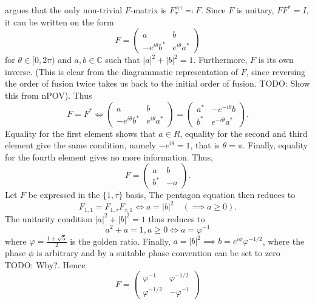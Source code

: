 \documentclass[a4paper,10pt,oneside]{book}
\theoremstyle{plain}
\theoremstyle{definition}
\theoremstyle{remark}
\begin{document}
{\cite[p. 389-390]{short intro fib} argues that the only non-trivial $F$-matrix is $F^{\tau\tau\tau}_\tau \eqqcolon F$.
Since $F$ is unitary, $FF^* = I$, it can be written on the form
\begin{equation*}
  F = \begin{pmatrix} a & b \\ -e^{i\theta}b^* & e^{i\theta}a^* \end{pmatrix}
\end{equation*}
for $\theta \in [0, 2\pi)$ and $a, b \in \mathbb{C}$ such that $|a|^2 + |b|^2 = 1$.
Furthermore, $F$ is its own inverse. (This is clear from the diagrammatic representation of $F$, since reversing the order of fusion twice takes us back to the initial order of fusion. TODO: Show this from nPOV). Thus
\begin{equation*}
  F = F^*
  \iff
  \begin{pmatrix} a & b \\ -e^{i\theta}b^* & e^{i\theta}a^* \end{pmatrix}
  =
  \begin{pmatrix} a^* & -e^{-i\theta}b \\ b^* & e^{-i\theta}a^* \end{pmatrix}.
\end{equation*}
Equality for the first element shows that $a \in R$, equality for the second and third element give the same condition, namely $-e^{i\theta} = 1$, that is $\theta = \pi$. Finally, equality for the fourth element gives no more information. Thus,
\begin{equation*}
  F = \begin{pmatrix} a & b \\ b^* & -a \end{pmatrix}.
\end{equation*}
Let $F$ be expressed in the $\{1, \tau\}$ basis, The pentagon equation then reduces to
\begin{equation*}
  F_{1,1} = F_{1,\tau} F_{\tau,1} \iff a = |b|^2 \quad (\implies a \ge 0).
\end{equation*}
The unitarity condition $|a|^2 + |b|^2 = 1$ thus reduces to
\begin{equation*}
  a^2 + a = 1, a \ge 0 \iff a = \varphi^{-1}
\end{equation*}
where $\varphi = \frac{1+\sqrt{5}}{2}$ is the golden ratio. Finally, $a = |b|^2 \implies b = e^{i\phi}\varphi^{-1/2}$, where the phase $\phi$ is arbitrary and by a suitable phase convention can be set to zero TODO: Why?. Hence
\begin{equation*}
  F = \begin{pmatrix} \varphi^{-1} & \varphi^{-1/2} \\ \varphi^{-1/2} & -\varphi^{-1} \end{pmatrix}
\end{equation*}

}
\end{document}
